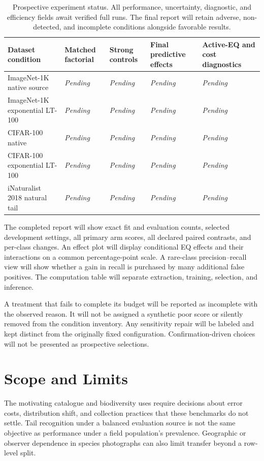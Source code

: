 \documentclass[conference]{IEEEtran}
\newcommand{\Pending}{\textit{Pending}}
\begin{document}
\begin{table}[t]
\centering\footnotesize
\caption{Prospective experiment status. All performance, uncertainty, diagnostic, and efficiency fields await verified full runs. The final report will retain adverse, non-detected, and incomplete conditions alongside favorable results.}
\label{tab:status}
\begin{tabularx}{\textwidth}{@{}lXXXX@{}}
\toprule
Dataset condition & Matched factorial & Strong controls & Final predictive effects & Active-EQ and cost diagnostics\\
\midrule
ImageNet-1K native source & \Pending & \Pending & \Pending & \Pending\\
ImageNet-1K exponential LT-100 & \Pending & \Pending & \Pending & \Pending\\
CIFAR-100 native & \Pending & \Pending & \Pending & \Pending\\
CIFAR-100 exponential LT-100 & \Pending & \Pending & \Pending & \Pending\\
iNaturalist 2018 natural tail & \Pending & \Pending & \Pending & \Pending\\
\bottomrule
\end{tabularx}
\end{table}

The completed report will show exact fit and evaluation counts, selected development settings, all primary arm scores, all declared paired contrasts, and per-class changes. An effect plot will display conditional EQ effects and their interactions on a common percentage-point scale. A rare-class precision--recall view will show whether a gain in recall is purchased by many additional false positives. The computation table will separate extraction, training, selection, and inference.

A treatment that fails to complete its budget will be reported as incomplete with the observed reason. It will not be assigned a synthetic poor score or silently removed from the condition inventory. Any sensitivity repair will be labeled and kept distinct from the originally fixed configuration. Confirmation-driven choices will not be presented as prospective selections.

\section{Scope and Limits}
The motivating catalogue and biodiversity uses require decisions about error costs, distribution shift, and collection practices that these benchmarks do not settle. Tail recognition under a balanced evaluation source is not the same objective as performance under a field population's prevalence. Geographic or observer dependence in species photographs can also limit transfer beyond a row-level split.
\end{document}
